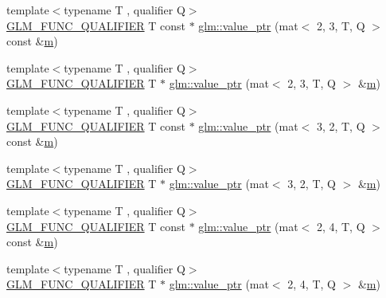 \begin{DoxyCompactItemize}
\item 
{\footnotesize template$<$typename T , qualifier Q$>$ }\\\mbox{\hyperlink{setup_8hpp_a33fdea6f91c5f834105f7415e2a64407}{G\+L\+M\+\_\+\+F\+U\+N\+C\+\_\+\+Q\+U\+A\+L\+I\+F\+I\+ER}} T const  $\ast$ \mbox{\hyperlink{group__gtc__type__ptr_ga2be1ab45c7a864986baac31557910adb}{glm\+::value\+\_\+ptr}} (mat$<$ 2, 3, T, Q $>$ const \&\mbox{\hyperlink{_s_d_l__opengl__glext_8h_af593500c283bf1a787a6f947f503a5c2}{m}})
\item 
{\footnotesize template$<$typename T , qualifier Q$>$ }\\\mbox{\hyperlink{setup_8hpp_a33fdea6f91c5f834105f7415e2a64407}{G\+L\+M\+\_\+\+F\+U\+N\+C\+\_\+\+Q\+U\+A\+L\+I\+F\+I\+ER}} T $\ast$ \mbox{\hyperlink{group__gtc__type__ptr_gab420b07b29bb3bb1cec07b6c31725fef}{glm\+::value\+\_\+ptr}} (mat$<$ 2, 3, T, Q $>$ \&\mbox{\hyperlink{_s_d_l__opengl__glext_8h_af593500c283bf1a787a6f947f503a5c2}{m}})
\item 
{\footnotesize template$<$typename T , qualifier Q$>$ }\\\mbox{\hyperlink{setup_8hpp_a33fdea6f91c5f834105f7415e2a64407}{G\+L\+M\+\_\+\+F\+U\+N\+C\+\_\+\+Q\+U\+A\+L\+I\+F\+I\+ER}} T const  $\ast$ \mbox{\hyperlink{group__gtc__type__ptr_ga0c9f0f561c848ec89d34977eff6a7b17}{glm\+::value\+\_\+ptr}} (mat$<$ 3, 2, T, Q $>$ const \&\mbox{\hyperlink{_s_d_l__opengl__glext_8h_af593500c283bf1a787a6f947f503a5c2}{m}})
\item 
{\footnotesize template$<$typename T , qualifier Q$>$ }\\\mbox{\hyperlink{setup_8hpp_a33fdea6f91c5f834105f7415e2a64407}{G\+L\+M\+\_\+\+F\+U\+N\+C\+\_\+\+Q\+U\+A\+L\+I\+F\+I\+ER}} T $\ast$ \mbox{\hyperlink{group__gtc__type__ptr_gacd2f2c950912a073f6f77494df9e42a6}{glm\+::value\+\_\+ptr}} (mat$<$ 3, 2, T, Q $>$ \&\mbox{\hyperlink{_s_d_l__opengl__glext_8h_af593500c283bf1a787a6f947f503a5c2}{m}})
\item 
{\footnotesize template$<$typename T , qualifier Q$>$ }\\\mbox{\hyperlink{setup_8hpp_a33fdea6f91c5f834105f7415e2a64407}{G\+L\+M\+\_\+\+F\+U\+N\+C\+\_\+\+Q\+U\+A\+L\+I\+F\+I\+ER}} T const  $\ast$ \mbox{\hyperlink{group__gtc__type__ptr_ga81f821818736c8cb80a899cf5819aac9}{glm\+::value\+\_\+ptr}} (mat$<$ 2, 4, T, Q $>$ const \&\mbox{\hyperlink{_s_d_l__opengl__glext_8h_af593500c283bf1a787a6f947f503a5c2}{m}})
\item 
{\footnotesize template$<$typename T , qualifier Q$>$ }\\\mbox{\hyperlink{setup_8hpp_a33fdea6f91c5f834105f7415e2a64407}{G\+L\+M\+\_\+\+F\+U\+N\+C\+\_\+\+Q\+U\+A\+L\+I\+F\+I\+ER}} T $\ast$ \mbox{\hyperlink{group__gtc__type__ptr_ga4c03b3900c5a82d8915b0c8c6d5dce4e}{glm\+::value\+\_\+ptr}} (mat$<$ 2, 4, T, Q $>$ \&\mbox{\hyperlink{_s_d_l__opengl__glext_8h_af593500c283bf1a787a6f947f503a5c2}{m}})

\end{DoxyCompactItemize}
